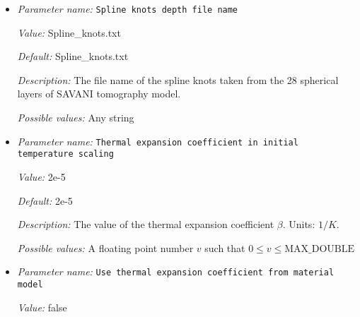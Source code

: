 \begin{itemize}
{\it Value:} false


{\it Default:} false


{\it Description:} Option to use a lower maximum order when reading the data file of spherical harmonic coefficients. This is probably used for the faster tests or when the users only want to see the spherical harmonic pattern up to a certain order.


{\it Possible values:} A boolean value (true or false)
\item {\it Parameter name:} {\tt Spline knots depth file name}
\label{parameters:Initial temperature model/SAVANI perturbation/Spline knots depth file name}


{\it Value:} Spline\_knots.txt


{\it Default:} Spline\_knots.txt


{\it Description:} The file name of the spline knots taken from the 28 spherical layers of SAVANI tomography model.


{\it Possible values:} Any string
\item {\it Parameter name:} {\tt Thermal expansion coefficient in initial temperature scaling}
\label{parameters:Initial temperature model/SAVANI perturbation/Thermal expansion coefficient in initial temperature scaling}


{\it Value:} 2e-5


{\it Default:} 2e-5


{\it Description:} The value of the thermal expansion coefficient $\beta$. Units: $1/K$.


{\it Possible values:} A floating point number $v$ such that $0 \leq v \leq \text{MAX\_DOUBLE}$
\item {\it Parameter name:} {\tt Use thermal expansion coefficient from material model}
\label{parameters:Initial temperature model/SAVANI perturbation/Use thermal expansion coefficient from material model}


{\it Value:} false



\end{itemize}
